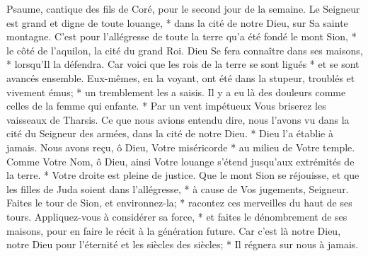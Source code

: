 Psaume, cantique des fils de Coré, pour le second jour de la semaine.
Le Seigneur est grand et digne de toute louange, * dans la cité de notre Dieu, sur Sa sainte montagne.
C'est pour l'allégresse de toute la terre qu'a été fondé le mont Sion, * le côté de l'aquilon, la cité du grand Roi.
Dieu Se fera connaître dans ses maisons, * lorsqu'Il la défendra.
Car voici que les rois de la terre se sont ligués * et se sont avancés ensemble.
Eux-mêmes, en la voyant, ont été dans la stupeur, troublés et vivement émus; *
un tremblement les a saisis. Il y a eu là des douleurs comme celles de la femme qui enfante. *
Par un vent impétueux Vous briserez les vaisseaux de Tharsis.
Ce que nous avions entendu dire, nous l'avons vu dans la cité du Seigneur des armées, dans la cité de notre Dieu. * Dieu l'a établie à jamais.
Nous avons reçu, ô Dieu, Votre miséricorde * au milieu de Votre temple.
Comme Votre Nom, ô Dieu, ainsi Votre louange s'étend jusqu'aux extrémités de la terre. * Votre droite est pleine de justice.
Que le mont Sion se réjouisse, et que les filles de Juda soient dans l'allégresse, * à cause de Vos jugements, Seigneur.
Faites le tour de Sion, et environnez-la; * racontez ces merveilles du haut de ses tours.
Appliquez-vous à considérer sa force, * et faites le dénombrement de ses maisons, pour en faire le récit à la génération future.
Car c'est là notre Dieu, notre Dieu pour l'éternité et les siècles des siècles; * Il régnera sur nous à jamais.

